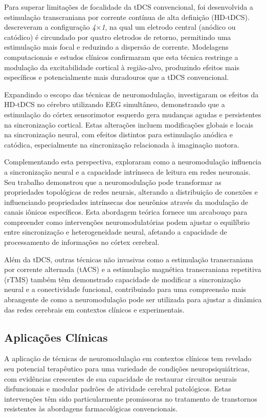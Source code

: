 Para superar limitações de focalidade da tDCS convencional, foi desenvolvida a estimulação transcraniana por corrente contínua de alta definição (HD-tDCS).  descreveram a configuração \emph{4$\times$1}, na qual um eletrodo central (anódico ou catódico) é circundado por quatro eletrodos de retorno, permitindo uma estimulação mais focal e reduzindo a dispersão de corrente. Modelagens computacionais e estudos clínicos confirmaram que esta técnica restringe a modulação da excitabilidade cortical à região-alvo, produzindo efeitos mais específicos e potencialmente mais duradouros que a tDCS convencional.

Expandindo o escopo das técnicas de neuromodulação,  investigaram os efeitos da HD-tDCS no cérebro utilizando EEG simultâneo, demonstrando que a estimulação do córtex sensorimotor esquerdo gera mudanças agudas e persistentes na sincronização cortical. Estas alterações incluem modificações globais e locais na sincronização neural, com efeitos distintos para estimulação anódica e catódica, especialmente na sincronização relacionada à imaginação motora.

Complementando esta perspectiva,  exploraram como a neuromodulação influencia a sincronização neural e a capacidade intrínseca de leitura em redes neuronais. Seu trabalho demonstrou que a neuromodulação pode transformar as propriedades topológicas de redes neurais, alterando a distribuição de conexões e influenciando propriedades intrínsecas dos neurônios através da modulação de canais iônicos específicos. Esta abordagem teórica fornece um arcabouço para compreender como intervenções neuromodulatórias podem ajustar o equilíbrio entre sincronização e heterogeneidade neural, afetando a capacidade de processamento de informações no córtex cerebral.

Além da tDCS, outras técnicas não invasivas como a estimulação transcraniana por corrente alternada (tACS) e a estimulação magnética transcraniana repetitiva (rTMS) também têm demonstrado capacidade de modificar a sincronização neural e a conectividade funcional, contribuindo para uma compreensão mais abrangente de como a neuromodulação pode ser utilizada para ajustar a dinâmica das redes cerebrais em contextos clínicos e experimentais.

\subsection{Aplicações Clínicas}
A aplicação de técnicas de neuromodulação em contextos clínicos tem revelado seu potencial terapêutico para uma variedade de condições neuropsiquiátricas, com evidências crescentes de sua capacidade de restaurar circuitos neurais disfuncionais e modular padrões de atividade cerebral patológicos. Estas intervenções têm sido particularmente promissoras no tratamento de transtornos resistentes às abordagens farmacológicas convencionais.

